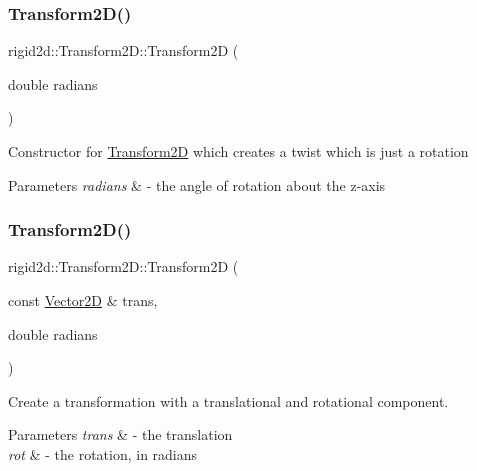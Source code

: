 \subsubsection{\texorpdfstring{Transform2\+D()}{Transform2D()}\hspace{0.1cm}{\footnotesize\ttfamily [2/4]}}
{\footnotesize\ttfamily rigid2d\+::\+Transform2\+D\+::\+Transform2D (\begin{DoxyParamCaption}\item[{double}]{radians }\end{DoxyParamCaption})\hspace{0.3cm}{\ttfamily [explicit]}}

Constructor for \hyperlink{classrigid2d_1_1Transform2D}{Transform2D} which creates a twist which is just a rotation 
\begin{DoxyParams}{Parameters}
{\em radians} & -\/ the angle of rotation about the z-\/axis \\
\hline
\end{DoxyParams}
\mbox{\label{classrigid2d_1_1Transform2D_a47de6c24f25c57da553a0fdaf13e2138}} 
\subsubsection{\texorpdfstring{Transform2\+D()}{Transform2D()}\hspace{0.1cm}{\footnotesize\ttfamily [3/4]}}
{\footnotesize\ttfamily rigid2d\+::\+Transform2\+D\+::\+Transform2D (\begin{DoxyParamCaption}\item[{const \hyperlink{structrigid2d_1_1Vector2D}{Vector2D} \&}]{trans,  }\item[{double}]{radians }\end{DoxyParamCaption})}



Create a transformation with a translational and rotational component. 


\begin{DoxyParams}{Parameters}
{\em trans} & -\/ the translation \\
\hline
{\em rot} & -\/ the rotation, in radians \\
\hline
\end{DoxyParams}
\mbox{\label{classrigid2d_1_1Transform2D_a85302460b333608ad9e37cdbd71b78ac}} 
